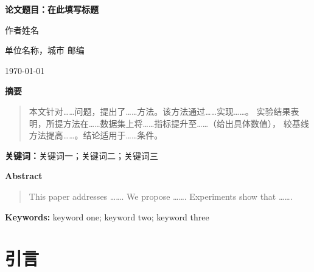 \documentclass[UTF8,a4paper,zihao=-4]{ctexart}
\newenvironment{cnabstract}{%
  \begin{center}\large\bfseries\heiti 摘要\end{center}
  \vspace{-6pt}
  \begin{quote}
}{%
  \end{quote}
}
\begin{document}
\linespread{1.35}\selectfont
\pagestyle{plain}

\begin{center}
  {\LARGE\bfseries\heiti 论文题目：在此填写标题\par}
  \vspace{12pt}
  {\normalsize 作者姓名\par}
  \vspace{3pt}
  {\small 单位名称，城市 邮编\par}
  \vspace{3pt}
  {\small \today\par}
\end{center}

\vspace{6pt}

\begin{cnabstract}
本文针对\ldots\ldots 问题，提出了\ldots\ldots 方法。该方法通过\ldots\ldots 实现\ldots\ldots。
实验结果表明，所提方法在\ldots\ldots 数据集上将\ldots\ldots 指标提升至\ldots\ldots（给出具体数值），
较基线方法提高\ldots\ldots。结论适用于\ldots\ldots 条件。
\end{cnabstract}

\noindent\textbf{关键词：}关键词一；关键词二；关键词三

\vspace{8pt}

\begin{center}\large\bfseries Abstract\end{center}
\vspace{-6pt}
\begin{quote}
\small
This paper addresses \ldots\ldots. We propose \ldots\ldots. Experiments show that \ldots\ldots.
\end{quote}
\noindent\textbf{Keywords:} keyword one; keyword two; keyword three

\vspace{10pt}

\section{引言}
\label{sec:intro}
\end{document}
